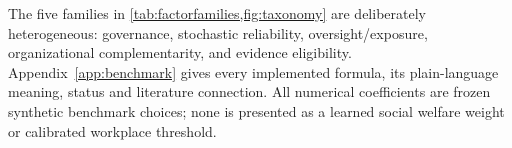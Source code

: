 


The five families in \cref{tab:factorfamilies,fig:taxonomy} are deliberately heterogeneous: governance, stochastic reliability, oversight/exposure, organizational complementarity, and evidence eligibility. Appendix~\ref{app:benchmark} gives every implemented formula, its plain-language meaning, status and literature connection. All numerical coefficients are frozen synthetic benchmark choices; none is presented as a learned social welfare weight or calibrated workplace threshold.
